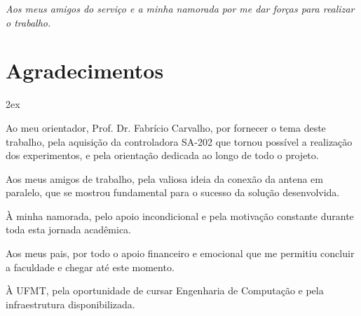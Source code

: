 %
%


\begin{titlepage}

\vspace*{\fill}

\hfill
\begin{minipage}{0.5\linewidth}
\begin{flushright}
\large\it
Aos meus amigos do serviço e a minha namorada por me dar forças para realizar o trabalho.
\end{flushright}
\end{minipage}

\vspace*{\fill}

\end{titlepage}

%
%


\chapter*{Agradecimentos}
\thispagestyle{empty}

\begin{trivlist}  \itemsep 2ex

\item Ao meu orientador, Prof. Dr. Fabrício Carvalho, por fornecer o tema deste trabalho, pela aquisição da controladora SA-202 que tornou possível a realização dos experimentos, e pela orientação dedicada ao longo de todo o projeto.

\item Aos meus amigos de trabalho, pela valiosa ideia da conexão da antena em paralelo, que se mostrou fundamental para o sucesso da solução desenvolvida.

\item À minha namorada, pelo apoio incondicional e pela motivação constante durante toda esta jornada acadêmica.

\item Aos meus pais, por todo o apoio financeiro e emocional que me permitiu concluir a faculdade e chegar até este momento.

\item À UFMT, pela oportunidade de cursar Engenharia de Computação e pela infraestrutura disponibilizada.

\end{trivlist}
